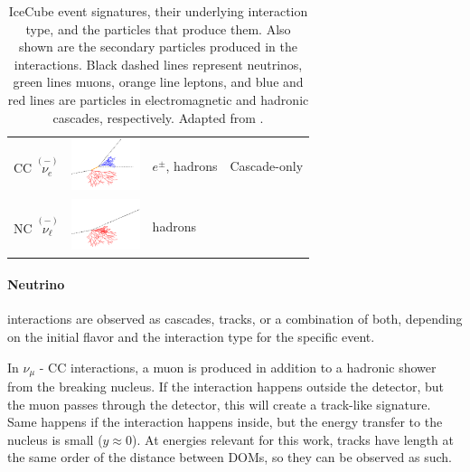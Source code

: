 \begin{table}[h]
\begin{center}
\begin{tabular}{ m{1.8cm} m{2.0cm} m{3.0cm} m{1.8cm} }
            \cmidrule{1-3} CC $\overset{(-)}{\nu_e}$ 
            & \includegraphics[width=2cm]{figures/neutrinos_properties/interaction_schematics/nue_CC_cascadeonly.pdf}
            & $e^\pm$, hadrons & {Cascade-only} \\

            \cmidrule{1-3}

            NC $\overset{(-)}{\nu_\ell}$ 
            & \includegraphics[width=2cm]{figures/neutrinos_properties/interaction_schematics/nuall_NC_cascadeonly.pdf} 
            & hadrons &  {} \\

            \hline
        \end{tabular}
    \end{center}
    \caption[IceCube event signatures and underlying interactions]{IceCube event signatures, their underlying interaction type, and the particles that produce them. Also shown are the secondary particles produced in the interactions. Black dashed lines represent neutrinos, green lines muons, orange line leptons, and blue and red lines are particles in electromagnetic and hadronic cascades, respectively. Adapted from \cite{ATerliuk}.}
\end{table}


\paragraph{Neutrino} interactions are observed as cascades, tracks, or a combination of both, depending on the initial flavor and the interaction type for the specific event.

In $\nu_\mu$ - CC interactions, a muon is produced in addition to a hadronic shower from the breaking nucleus. If the interaction happens outside the detector, but the muon passes through the detector, this will create a track-like signature. Same happens if the interaction happens inside, but the energy transfer to the nucleus is small ($y \approx 0$). At energies relevant for this work, tracks have length at the same order of the distance between DOMs, so they can be observed as such.

